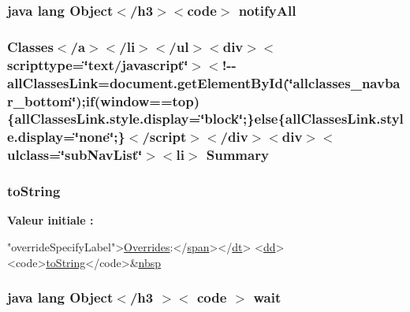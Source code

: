 \hypertarget{_alert_8html_a1279357e6e09e33e75b55eb05fdb6436}{
\subsubsection[{notify\-All}]{\setlength{\rightskip}{0pt plus 5cm}java lang Object$<$/h3$>$$<$code$>$ notify\-All}}\label{_alert_8html_a1279357e6e09e33e75b55eb05fdb6436}
\hypertarget{_alert_8html_a6f9ab45abc9b0679dc1b132fbacfc681}{
\subsubsection[{Summary}]{\setlength{\rightskip}{0pt plus 5cm}Classes$<$/{\bf a}$>$$<$/li$>$$<$/ul$>$$<$div$>$$<$scripttype=\char`\"{}text/javascript\char`\"{}$>$$<$!-\/-\/all\-Classes\-Link=document.\-get\-Element\-By\-Id(\char`\"{}allclasses\-\_\-navbar\-\_\-bottom\char`\"{});if(window==top)\{all\-Classes\-Link.\-style.\-display=\char`\"{}block\char`\"{};\}else\{all\-Classes\-Link.\-style.\-display=\char`\"{}none\char`\"{};\}$<$/script$>$$<$/div$>$$<$div$>$$<$ulclass=\char`\"{}sub\-Nav\-List\char`\"{}$>$$<$li$>$ Summary}}\label{_alert_8html_a6f9ab45abc9b0679dc1b132fbacfc681}
\hypertarget{_alert_8html_a24c5226c4bb106e090fcda03479aab24}{
\subsubsection[{to\-String}]{\setlength{\rightskip}{0pt plus 5cm}to\-String}}\label{_alert_8html_a24c5226c4bb106e090fcda03479aab24}
{\bfseries Valeur initiale \-:}
\begin{DoxyCode}
\textcolor{stringliteral}{"overrideSpecifyLabel"}>\hyperlink{_sensor_activity_8html_aed76f90ed460c58c4a3ab820f77c466f}{Overrides}:</\hyperlink{stylesheet_8css_a8343996ebcf16220b04e54659aac31cc}{span}></\hyperlink{stylesheet_8css_a107565fb4039d33b041380d6e0ea1d80}{dt}>
<\hyperlink{stylesheet_8css_a47f4718a86835a7771ec592ece845221}{dd}><code>\hyperlink{_alert_8html_a24c5226c4bb106e090fcda03479aab24}{toString}</code>&\hyperlink{allclasses-frame_8html_aef915316f784c9063d942974538301a6}{nbsp}
\end{DoxyCode}
\hypertarget{_alert_8html_a6d9f8a0d8756b0a257653394e73fa131}{
\subsubsection[{wait}]{\setlength{\rightskip}{0pt plus 5cm}java lang Object$<$/h3 $>$$<$ code $>$ wait}}\label{_alert_8html_a6d9f8a0d8756b0a257653394e73fa131}
